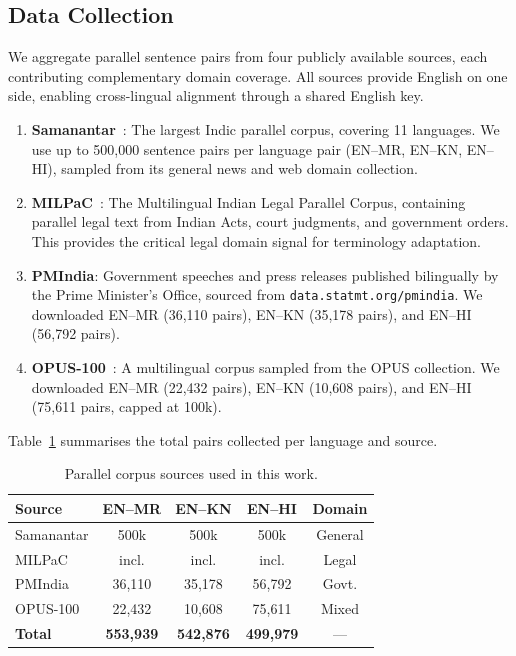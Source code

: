 \documentclass[conference,letterpaper]{IEEEtran}
\begin{document}
\subsection{Data Collection}
We aggregate parallel sentence pairs from four publicly available sources,
each contributing complementary domain coverage. All sources provide
English on one side, enabling cross-lingual alignment through a shared
English key.

\begin{enumerate}
    \item \textbf{Samanantar}~\cite{ramesh2021samanantar}: The largest
    Indic parallel corpus, covering 11 languages. We use up to 500,000
    sentence pairs per language pair (EN--MR, EN--KN, EN--HI),
    sampled from its general news and web domain collection.
    \item \textbf{MILPaC}~\cite{milpac2022}: The Multilingual Indian
    Legal Parallel Corpus, containing parallel legal text from Indian
    Acts, court judgments, and government orders. This provides the
    critical legal domain signal for terminology adaptation.
    \item \textbf{PMIndia}: Government speeches and press releases
    published bilingually by the Prime Minister's Office, sourced from
    \texttt{data.statmt.org/pmindia}. We downloaded EN--MR (36,110
    pairs), EN--KN (35,178 pairs), and EN--HI (56,792 pairs).
    \item \textbf{OPUS-100}~\cite{zhang2020opus100}: A multilingual
    corpus sampled from the OPUS collection. We downloaded EN--MR
    (22,432 pairs), EN--KN (10,608 pairs), and EN--HI (75,611 pairs,
    capped at 100k).
\end{enumerate}

Table~\ref{tab:datasources} summarises the total pairs collected per
language and source.

\begin{table}[h]
\centering
\caption{Parallel corpus sources used in this work.}
\label{tab:datasources}
\renewcommand{\arraystretch}{1.2}
\begin{tabular}{lcccc}
\toprule
\textbf{Source} & \textbf{EN--MR} & \textbf{EN--KN} & \textbf{EN--HI} & \textbf{Domain} \\
\midrule
Samanantar & 500k & 500k & 500k & General \\
MILPaC     & incl. & incl. & incl. & Legal \\
PMIndia    & 36,110 & 35,178 & 56,792 & Govt. \\
OPUS-100   & 22,432 & 10,608 & 75,611 & Mixed \\
\midrule
\textbf{Total} & \textbf{553,939} & \textbf{542,876} & \textbf{499,979} & --- \\
\bottomrule
\end{tabular}
\end{table}
\end{document}
